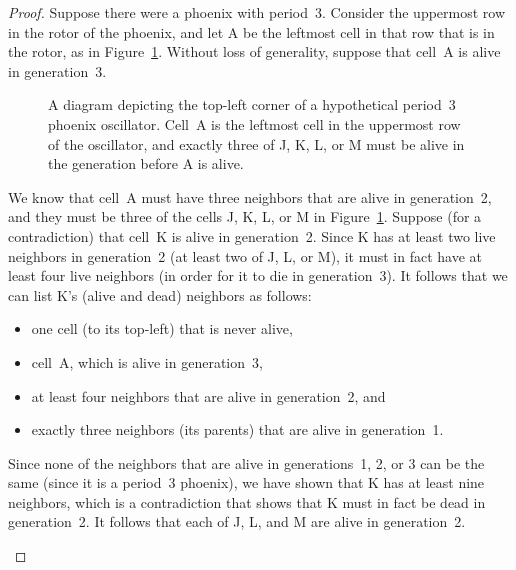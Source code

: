 \begin{proof}
	Suppose there were a phoenix with period~3. Consider the uppermost row in the rotor of the phoenix, and let A be the leftmost cell in that row that is in the rotor, as in Figure~\ref{fig:phoenix_proof_2}. Without loss of generality, suppose that cell~A is alive in generation~3.
	
	\begin{figure}[!htb]
		\centering{}
		\caption{A diagram depicting the top-left corner of a hypothetical period~3 phoenix oscillator. Cell~A is the leftmost cell in the uppermost row of the oscillator, and exactly three of J, K, L, or M must be alive in the generation before A is alive.}\label{fig:phoenix_proof_2}
	\end{figure}
	
	We know that cell~A must have three neighbors that are alive in generation~2, and they must be three of the cells J, K, L, or M in Figure~\ref{fig:phoenix_proof_2}. Suppose (for a contradiction) that cell~K is alive in generation~2. Since K has at least two live neighbors in generation~2 (at least two of J, L, or M), it must in fact have at least four live neighbors (in order for it to die in generation~3). It follows that we can list K's (alive and dead) neighbors as follows:
	
	\begin{itemize}
		\item one cell (to its top-left) that is never alive,
		
		\item cell~A, which is alive in generation~3,
		
		\item at least four neighbors that are alive in generation~2, and
		
		\item exactly three neighbors (its parents) that are alive in generation~1.
	\end{itemize}
	
	Since none of the neighbors that are alive in generations~1, 2, or 3 can be the same (since it is a period~3 phoenix), we have shown that K has at least nine neighbors, which is a contradiction that shows that K must in fact be dead in generation~2. It follows that each of J, L, and M are alive in generation~2.
	\begin{figure}[!ht]
		\centering{}
\end{figure}
\end{proof}
